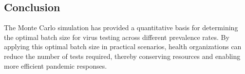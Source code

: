 \documentclass[12pt]{article}
\begin{document}

\subsection*{Conclusion}
The Monte Carlo simulation has provided a quantitative basis for determining the optimal batch size for virus testing across different prevalence rates. By applying this optimal batch size in practical scenarios, health organizations can reduce the number of tests required, thereby conserving resources and enabling more efficient pandemic responses.
\end{document}
